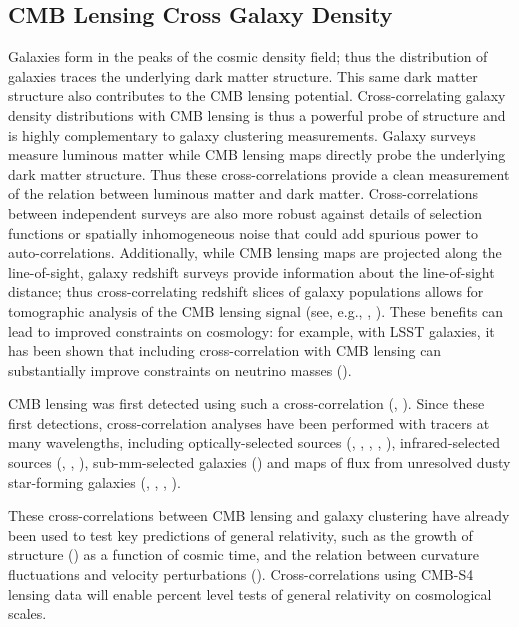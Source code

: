 \subsection{CMB Lensing Cross Galaxy Density}
Galaxies form in the peaks of the cosmic density field; thus the distribution of galaxies traces the underlying dark matter structure.  This same dark matter structure also contributes to the CMB lensing potential.
Cross-correlating galaxy density distributions with CMB lensing is thus a powerful probe of structure and is highly complementary to galaxy clustering measurements.
Galaxy surveys measure luminous matter while CMB lensing maps directly probe the underlying dark matter structure. Thus these cross-correlations provide a clean measurement of the relation between luminous matter and dark matter.
Cross-correlations between independent surveys are also more robust against details of selection functions or spatially inhomogeneous noise that could add spurious power to auto-correlations.
Additionally, while CMB lensing maps are projected along the line-of-sight, galaxy redshift surveys provide information about the line-of-sight distance; thus cross-correlating redshift slices of galaxy populations allows for tomographic analysis of the CMB lensing signal (see, e.g., \cite{Baxter:2016ziy}, \cite{Miyatake:2016gdc}).
These benefits can lead to improved constraints on cosmology: for example, with LSST galaxies, it has been shown that including cross-correlation with CMB lensing can substantially improve constraints on neutrino masses (\cite{Pearson:2013iha}).


CMB lensing was first detected using such a cross-correlation (\cite{Smith:2007rg}, \cite{Hirata:2008cb}).  Since these first detections, cross-correlation analyses have been performed with tracers at many wavelengths, including optically-selected sources (\cite{Bleem:2012gm}, \cite{Sherwin:2012mr}, \cite{Ade:2013tyw}, \cite{Baxter:2016ziy}, \cite{Pullen:2015vtb}), infrared-selected sources (\cite{Bleem:2012gm}, \cite{Geach:2013zwa}, \cite{DiPompeo:2014yea}), sub-mm-selected galaxies (\cite{Bianchini:2014dla}) and maps of flux from unresolved dusty star-forming galaxies (\cite{Holder:2013hqu}, \cite{Hanson:2013daa}, \cite{Ade:2013aro}, \cite{vanEngelen:2014zlh}). 

These cross-correlations between CMB lensing and galaxy clustering have already been used to test key predictions of general relativity, such as the growth of structure (\cite{Baxter:2016ziy}) as a function of cosmic time, and the relation between curvature fluctuations and velocity perturbations (\cite{Pullen:2015vtb}). Cross-correlations using CMB-S4 lensing data will enable percent level tests of general relativity on cosmological scales.

